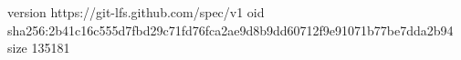 version https://git-lfs.github.com/spec/v1
oid sha256:2b41c16c555d7fbd29c71fd76fca2ae9d8b9dd60712f9e91071b77be7dda2b94
size 135181
